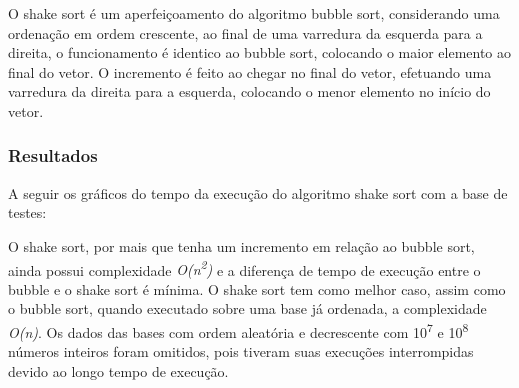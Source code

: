 \documentclass[fleqn,10pt]{SelfArx} %
\begin{document}
O shake sort é um aperfeiçoamento do algoritmo bubble sort, considerando uma ordenação em ordem crescente, ao final de uma 
varredura da esquerda para a direita, o funcionamento é identico ao bubble sort, colocando o maior elemento ao final do 
vetor. O incremento é feito ao chegar no final do vetor, efetuando uma varredura da direita para a esquerda, colocando o 
menor elemento no início do vetor.

\subsubsection*{Resultados}

A seguir os gráficos do tempo da execução do algoritmo shake sort com a base de testes:\newline

{\setlength{\parindent}{-0.5em}
}\newline

{\setlength{\parindent}{-0.5em}
}\newline

{\setlength{\parindent}{-0.5em}
}\newline

O shake sort, por mais que tenha um incremento em relação ao bubble sort, ainda possui complexidade 
\emph{O(n\textsuperscript{2})} e a diferença de tempo de execução entre o bubble e o shake sort é mínima. O shake sort 
tem como melhor caso, assim como o bubble sort, quando executado sobre uma base já ordenada, a complexidade \emph{O(n)}.
Os dados das bases com ordem aleatória e decrescente com 10\textsuperscript{7} e 10\textsuperscript{8} números inteiros 
foram omitidos, pois tiveram suas execuções interrompidas devido ao longo tempo de execução.
\end{document}
